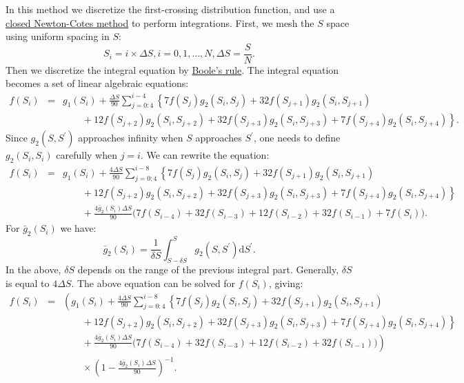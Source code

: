 In this method we discretize the first-crossing distribution function, and use a \href{http://en.wikipedia.org/wiki/Newton%E2%80%93Cotes_formulas#Closed_Newton.E2.80.93Cotes_formulae}{closed Newton-Cotes method} to perform integrations. First, we mesh the $S$ space using uniform spacing in $S$:
\begin{equation}
  S_i = i \times \Delta S , i = 0, 1, \dots, N, \Delta S = \frac{S}{N}.
\end{equation}
Then we discretize the integral equation by \href{http://en.wikipedia.org/wiki/Boole%27s_rule}{Boole's rule}. The integral equation becomes a set of linear algebraic equations:
\begin{eqnarray}
 f(S_i)  &=&  g_1(S_i)  +  \frac{ \Delta S}{90}  \sum_{j=0:4}^{i-4}   \left\{ 7 f(S_j) g_2(S_i, S_j) + 32 f(S_{j+1}) g_2(S_i, S_{j+1})  \right.\nonumber\\
 &&\qquad \left. {}     + 12 f(S_{j+2}) g_2(S_i, S_{j+2}) + 32 f(S_{j+3}) g_2(S_i, S_{j+3}) + 7 f(S_{j+4}) g_2(S_i, S_{j+4})  \right\}.
\end{eqnarray}
Since $g_2(S, S^\prime)$ approaches infinity when $S$ approaches $S^\prime$, one needs to define $g_2(S_i, S_i)$ carefully when $j = i$. We can rewrite the equation:
\begin{eqnarray}
       f(S_i)  &=&  g_1(S_i)  +  \frac{ 4 \Delta S}{90}  \sum_{j=0:4}^{i-8}   \left\{ 7 f(S_j) g_2(S_i, S_j) + 32 f(S_{j+1}) g_2(S_i, S_{j+1})  \right.\nonumber\\
       &&\qquad \left. {}     + 12 f(S_{j+2}) g_2(S_i, S_{j+2}) + 32 f(S_{j+3}) g_2(S_i, S_{j+3}) + 7 f(S_{j+4}) g_2(S_i, S_{j+4})  \right\} \nonumber\\ 
       &&\qquad {}     + \frac{ 4  \bar{g}_2(S_i) \Delta S}{90} \Big( 7 f(S_{i-4})  + 32 f(S_{i-3}) + 12 f(S_{i-2}) + 32 f(S_{i-1}) + 7 f(S_i)  \Big).
\end{eqnarray}
For $ \bar{g}_2(S_i)$ we have:
\begin{equation}
  \bar{g}_2(S_i) = \frac{1}{\delta S} \int_{S - \delta S}^S g_2(S,S^\prime){\mathrm d}S^\prime.
\end{equation}
In the above, $\delta S$ depends on the range of the previous integral part. Generally, $\delta S$ is equal to $4 \Delta S$. The above equation can be solved for $f(S_i)$, giving:
\begin{eqnarray}
       f(S_i)  &=&  \left( g_1(S_i)  +  \frac{ 4 \Delta S}{90}  \sum_{j=0:4}^{i-8}   \left\{ 7 f(S_j) g_2(S_i, S_j)  + 32 f(S_{j+1}) g_2(S_i, S_{j+1})  \right.\right.\nonumber\\
       &&\qquad \left.\left. {}     + 12 f(S_{j+2}) g_2(S_i, S_{j+2})  + 32 f(S_{j+3}) g_2(S_i, S_{j+3}) + 7 f(S_{j+4}) g_2(S_i, S_{j+4})    \right\} \right. \nonumber\\ 
       &&\qquad \left. {}     + \frac{4  \bar{g}_2(S_i) \Delta S }{90} \Big( 7 f(S_{i-4})  + 32 f(S_{i-3}) + 12 f(S_{i-2})  + 32 f(S_{i-1})   \Big) \right) \nonumber\\
       &&\qquad {}     \times \left( 1 -  \frac{ 4  \bar{g}_2(S_i) \Delta S}{90}  \right)^{-1}.
\end{eqnarray}
